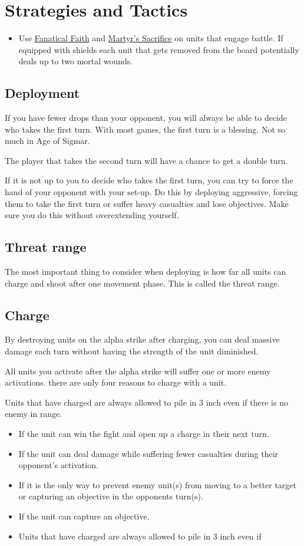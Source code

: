 \section{Strategies and Tactics}
\begin{itemize}
    \item Use \hyperref[fanatical-faith]{Fanatical Faith} and \hyperref[martyrs-sacrifice]{Martyr's Sacrifice} on units that engage battle. If equipped with shields each unit that gets removed from the board potentially deals up to two mortal wounds.
\end{itemize}

\subsection{Deployment}
If you have fewer drops than your opponent, you will always be able to decide who takes the first turn. With most games, the first turn is a blessing. Not so much in Age of Sigmar.

The player that takes the second turn will have a chance to get a double turn.

If it is not up to you to decide who takes the first turn, you can try to force the hand of your opponent with your set-up. Do this by deploying aggressive, forcing them to take the first turn or suffer heavy casualties and lose objectives. Make sure you do this without overextending yourself.
\subsection{Threat range}
The most important thing to consider when deploying is how far all units can charge and shoot after one movement phase. This is called the threat range.

\subsection{Charge}
By destroying units on the alpha strike after charging, you can deal massive damage each turn without having the strength of the unit diminished.

All units you activate after the alpha strike will suffer one or more enemy activations. 
there are only four reasons to charge with a unit.

Units that have charged are always allowed to pile in 3 inch even if there is no enemy in range. 

\begin{itemize}
    \item If the unit can win the fight and open up a charge in their next
        turn.
    \item If the unit can deal damage while suffering fewer casualties during
        their opponent’s activation.
    \item If it is the only way to prevent enemy unit(s) from moving to
        a better target or capturing an objective in the opponents turn(s).
    \item If the unit can capture an objective.
    \item Units that have charged are always allowed to pile in 3 inch even if
\end{itemize}

